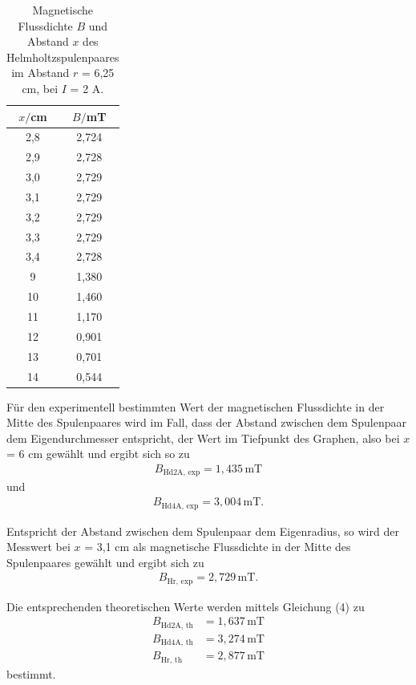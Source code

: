 \begin{table}[H]
  \centering
  \caption{Magnetische Flussdichte $B$  und Abstand $x$ des Helmholtzspulenpaares  im Abstand $r$ = 6,25 cm, bei $I$ = 2 A.}
  \begin{tabular}{c c}
    \toprule
     $x/$cm & $B/$mT  \\
    \midrule
    2,8 & 2,724 \\
    2,9 & 2,728 \\
    3,0 & 2,729 \\
    3,1 & 2,729 \\
    3,2 & 2,729 \\
    3,3 & 2,729 \\
    3,4 & 2,728 \\
    9 & 1,380\\
    10 & 1,460 \\
    11 & 1,170 \\
    12 & 0,901 \\
    13 & 0,701 \\
    14 & 0,544 \\

   
  \bottomrule
  \end{tabular}
\end{table}

Für den experimentell bestimmten Wert der magnetischen Flussdichte in der Mitte des 
Spulenpaares wird im Fall, dass
der Abstand zwischen dem Spulenpaar dem Eigendurchmesser entspricht, der Wert im Tiefpunkt
des Graphen, also bei $x$ = 6 cm gewählt und ergibt sich so zu
\begin{align*}
B_\text{Hd2A, exp} = 1,435\,\si{\milli\tesla}
\end{align*}
und
\begin{align*}
B_\text{Hd4A, exp} = 3,004\,\si{\milli\tesla}.
\end{align*}

Entspricht der Abstand zwischen dem Spulenpaar dem Eigenradius, so wird der Messwert bei
$x$ = 3,1 cm als magnetische Flussdichte in der Mitte des Spulenpaares gewählt und ergibt sich
zu
\begin{align*}
B_\text{Hr, exp} = 2,729\,\si{\milli\tesla}.
\end{align*}

Die entsprechenden theoretischen Werte werden mittels Gleichung (4) zu
\begin{align*}
B_\text{Hd2A, th} &=  1,637\,\si{\milli\tesla}\\
B_\text{Hd4A, th} &=  3,274\,\si{\milli\tesla}\\
B_\text{Hr, th} &= 2,877\,\si{\milli\tesla}
\end{align*}
bestimmt.

